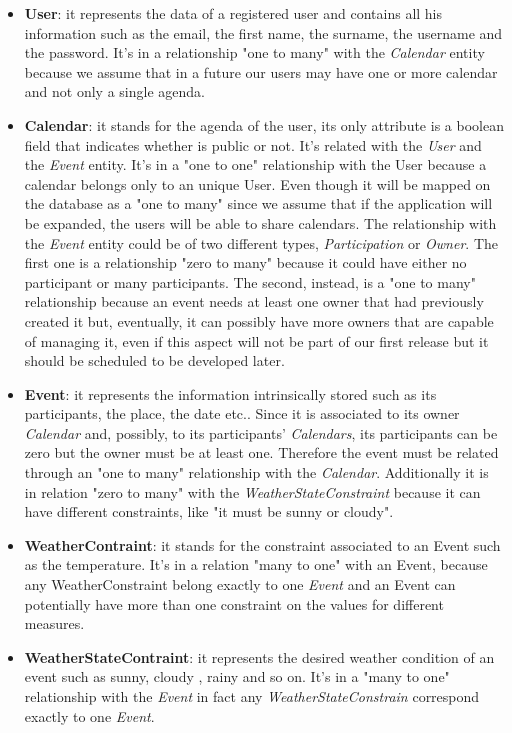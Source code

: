 \begin{itemize}
\item{\bf User}: it represents the data of a registered user and contains all his information such as the email, the first name, the surname, the username and the password. It's in a relationship "one to many" with the \textit{Calendar} entity because we assume that in a future our users may have one or more calendar and not only a single agenda.
\item{\bf Calendar}: it stands for the agenda of the user, its only attribute is a boolean field that indicates whether is public or not. It's related with the \textit{User} and the \textit{Event} entity. It's in a "one to one" relationship with the User because a calendar belongs only to an unique User. Even though it will be mapped on the database as a  "one to many" since we assume that  if the application will be expanded, the users will be able to share calendars. The relationship with the \textit{Event} entity could be of two different types, \textit{Participation} or \textit{Owner}. The first one is a relationship "zero to many" because it could have either no participant or many participants. The second, instead, is a "one to many" relationship because an event needs at least one owner that had previously created it but, eventually, it can possibly have more owners that are capable of managing it, even if this aspect will not be part of our first release but it should be scheduled to be developed later.
\item{\bf Event}: it represents the information intrinsically stored such as its participants, the place, the date etc.. Since it is associated to its owner \textit{Calendar} and, possibly, to its participants' \textit{Calendars}, its participants can be zero but the owner must be at least one. Therefore the event must be related through an "one to many" relationship with the \textit{Calendar}. Additionally it is in relation "zero to many" with the \textit{WeatherStateConstraint} because it can have different constraints, like "it must be sunny or cloudy".
\item{\bf WeatherContraint}: it stands for the constraint associated to an Event such as the temperature. It's in a relation "many to one" with an Event, because any WeatherConstraint belong exactly to one {\it Event} and an Event can potentially have more than one constraint on the values for different measures.
\item{\bf WeatherStateContraint}: it represents the desired weather condition of an event such as sunny, cloudy , rainy and so on. It's in a "many to one" relationship with the {\it Event} in fact any {\it WeatherStateConstrain} correspond exactly to one {\it Event}.
\end{itemize}
